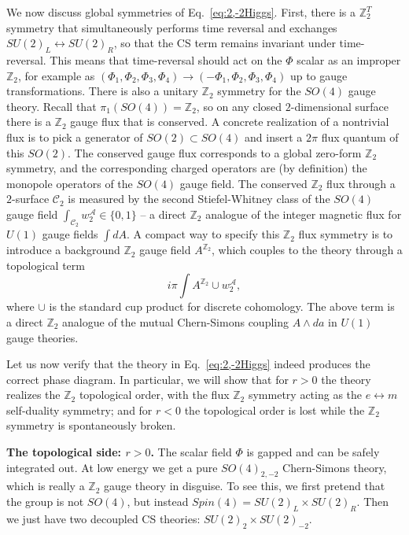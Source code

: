 \documentclass[aps, prl, superscriptaddress, twocolumn,
notitlepage, longbibliography,
floatfix]{revtex4-2}
\newcommand{\1}{\text{\uppercase\expandafter{\romannumeral1}}}
\newcommand{\2}{\text{\uppercase\expandafter{\romannumeral2}}}
\newcommand{\3}{\text{\uppercase\expandafter{\romannumeral3}}}
\newcommand{\4}{\text{\uppercase\expandafter{\romannumeral4}}}
\newcommand{\5}{\text{\uppercase\expandafter{\romannumeral5}}}
\newcommand{\6}{\text{\uppercase\expandafter{\romannumeral6}}}
\def\Z{\mathbb{Z}}
\begin{document}
We now discuss global symmetries of Eq.~\eqref{eq:2,-2Higgs}. First, there is a $\mathbb{Z}_2^T$ symmetry that simultaneously performs time reversal and exchanges $SU(2)_L\leftrightarrow SU(2)_R$, so that the CS term remains invariant under time-reversal. This means that time-reversal should act on the $\Phi$ scalar as an improper $\Z_2$, for example as $(\Phi_1,\Phi_2,\Phi_3,\Phi_4)\to (-\Phi_1,\Phi_2,\Phi_3,\Phi_4)$ up to gauge transformations. There is also a unitary $\Z_2$ symmetry for the $SO(4)$ gauge theory. Recall that $\pi_1(SO(4))=\Z_2$, so on any closed $2$-dimensional surface there is a $\Z_2$ gauge flux that is conserved. A concrete realization of a nontrivial flux is to pick a generator of $SO(2)\subset SO(4)$ and insert a $2\pi$ flux quantum of this $SO(2)$. The conserved gauge flux corresponds to a global zero-form $\Z_2$ symmetry, and the corresponding charged operators are (by definition) the monopole operators of the $SO(4)$ gauge field. The conserved $\Z_2$ flux through a $2$-surface $\mathcal{C}_2$ is measured by the second Stiefel-Whitney class  of the $SO(4)$ gauge field $\int_{\mathcal{C}_2}w_2^{\mathcal{A}}\in\{0,1\}$ -- a direct $\Z_2$ analogue of the integer magnetic flux for $U(1)$ gauge fields $\int dA$. A compact way to specify this $\Z_2$ flux symmetry is to introduce a background $\Z_2$ gauge field $A^{\Z_2}$, which couples to the theory through a topological term
\begin{equation}
    \label{eq:topocoupling}
    i\pi\int A^{\Z_2}\cup w_2^{\mathcal{A}},
\end{equation}
where $\cup$ is the standard cup product for discrete cohomology. The above term is a direct $\Z_2$ analogue of the mutual Chern-Simons coupling $A\wedge da$ in $U(1)$ gauge theories.


Let us now verify that the theory in Eq.~\eqref{eq:2,-2Higgs} indeed produces the correct phase diagram. In particular, we will show that for $r>0$ the theory realizes the $\Z_2$ topological order, with the flux $\Z_2$ symmetry acting as the $e\leftrightarrow m$ self-duality symmetry; and for $r<0$ the topological order is lost while the $\Z_2$ symmetry is spontaneously broken.

\textbf{\boldmath The topological side: $r>0$.} The scalar field $\Phi$ is gapped and can be safely integrated out. At low energy we get a pure $SO(4)_{2,-2}$ Chern-Simons theory, which is really a $\Z_2$ gauge theory in disguise. To see this, we first pretend that the group is not $SO(4)$, but instead $Spin(4)=SU(2)_L\times SU(2)_R$. Then we just have two decoupled CS theories: $SU(2)_2\times SU(2)_{-2}$.
\end{document}

